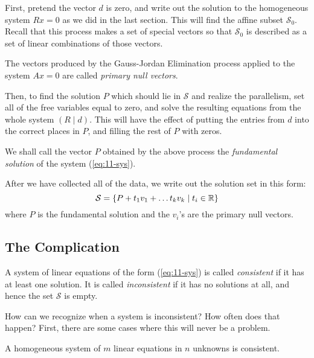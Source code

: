 \documentclass[elementsmain.tex]{subfiles}
\begin{document}
First, pretend the vector $d$ is zero, and write out the solution to the homogeneous system $Rx=0$ as we did in the last section. This will find the affine subset $\mathcal{S}_0$. Recall that this process makes a set of special vectors so that $\mathcal{S}_0$ is described as a set of linear combinations of those vectors. 

\begin{definition}
The vectors produced by the Gauss-Jordan Elimination process applied to the system
$Ax=0$ are called \emph{primary null vectors}.
\end{definition}


Then, to find the solution $P$ which should lie in $\mathcal{S}$ and realize the parallelism, set all of the free variables equal to zero, and solve the resulting equations from the whole system $\left(R \mid d \right)$. This will have the effect of putting the entries from $d$ into the correct places in $P$, and filling the rest of $P$ with zeros.

\begin{definition}
We shall call the vector $P$ obtained by the above process the \emph{fundamental solution} of the system (\ref{eq:11-sys}).
\end{definition}

After we have collected all of the data, we write out the solution set in this form:
\[
\mathcal{S} = \left\{ P + t_1 v_1 + \dots t_k v_k \mid t_i \in \mathbb{R} \right\}
\]
where $P$ is the fundamental solution and the $v_i$'s are the primary null vectors.


\subsection*{The Complication}

\begin{definition}
A system of linear equations of the form (\ref{eq:11-sys}) is called \emph{consistent} if it has at least one solution. It is called \emph{inconsistent} if it has no solutions at all, and hence the set $\mathcal{S}$ is empty.
\end{definition}

How can we recognize when a system is inconsistent? How often does that happen? First, there are some cases where this will never be a problem.

\begin{theorem} 
A homogeneous system of $m$ linear equations in $n$ unknowns is consistent.
\end{theorem}
\end{document}
